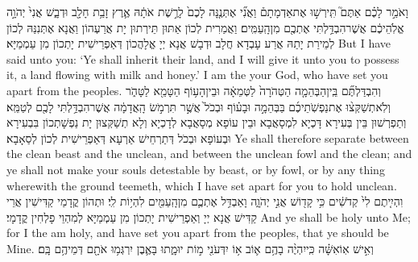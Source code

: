 {וָאֹמַ֣ר לָכֶ֗ם אַתֶּם֮ תִּֽירְשׁ֣וּ אֶת\maqqaf אַדְמָתָם֒ וַאֲנִ֞י אֶתְּנֶ֤נָּה לָכֶם֙ לָרֶ֣שֶׁת אֹתָ֔הּ אֶ֛רֶץ זָבַ֥ת חָלָ֖ב וּדְבָ֑שׁ אֲנִי֙ יְהֹוָ֣ה אֱלֹֽהֵיכֶ֔ם אֲשֶׁר\maqqaf הִבְדַּ֥לְתִּי אֶתְכֶ֖ם מִן\maqqaf הָֽעַמִּֽים׃}
{וַאֲמַרִית לְכוֹן אַתּוּן תֵּירְתוּן יָת אֲרַעְהוֹן וַאֲנָא אֶתְּנִנַּהּ לְכוֹן לְמֵירַת יָתַהּ אֲרַע עָבְדָא חֲלָב וּדְבָשׁ אֲנָא יְיָ אֱלָהֲכוֹן דְּאַפְרֵישִׁית יָתְכוֹן מִן עַמְמַיָּא׃}
{But I have said unto you: ‘Ye shall inherit their land, and I will give it unto you to possess it, a land flowing with milk and honey.’ I am the \lord\space your God, who have set you apart from the peoples.}{}
{וְהִבְדַּלְתֶּ֞ם בֵּֽין\maqqaf הַבְּהֵמָ֤ה הַטְּהֹרָה֙ לַטְּמֵאָ֔ה וּבֵין\maqqaf הָע֥וֹף הַטָּמֵ֖א לַטָּהֹ֑ר וְלֹֽא\maqqaf תְשַׁקְּצ֨וּ אֶת\maqqaf נַפְשֹֽׁתֵיכֶ֜ם בַּבְּהֵמָ֣ה וּבָע֗וֹף וּבְכֹל֙ אֲשֶׁ֣ר תִּרְמֹ֣שׂ הָֽאֲדָמָ֔ה אֲשֶׁר\maqqaf הִבְדַּ֥לְתִּי לָכֶ֖ם לְטַמֵּֽא׃}
{וְתַפְרְשׁוּן בֵּין בְּעִירָא דָּכְיָא לִמְסָאֲבָא וּבֵין עוֹפָא מְסָאֲבָא לְדָכְיָא וְלָא תְשַׁקְּצוּן יָת נַפְשָׁתְכוֹן בִּבְעִירָא וּבְעוֹפָא וּבְכֹל דְּתַרְחֵישׁ אַרְעָא דְּאַפְרֵישִׁית לְכוֹן לְסַאָבָא׃}
{Ye shall therefore separate between the clean beast and the unclean, and between the unclean fowl and the clean; and ye shall not make your souls detestable by beast, or by fowl, or by any thing wherewith the ground teemeth, which I have set apart for you to hold unclean.}{}
{וִהְיִ֤יתֶם לִי֙ קְדֹשִׁ֔ים כִּ֥י קָד֖וֹשׁ אֲנִ֣י יְהֹוָ֑ה וָאַבְדִּ֥ל אֶתְכֶ֛ם מִן\maqqaf הָֽעַמִּ֖ים לִהְי֥וֹת לִֽי׃}
{וּתְהוֹן קֳדָמַי קַדִּישִׁין אֲרֵי קַדִּישׁ אֲנָא יְיָ וְאַפְרֵישִׁית יָתְכוֹן מִן עַמְמַיָּא לְמִהְוֵי פָלְחִין קֳדָמָי׃}
{And ye shall be holy unto Me; for I the \lord\space am holy, and have set you apart from the peoples, that ye should be Mine.}{}
{וְאִ֣ישׁ אֽוֹ\maqqaf אִשָּׁ֗ה כִּֽי\maqqaf יִהְיֶ֨ה בָהֶ֥ם א֛וֹב א֥וֹ יִדְּעֹנִ֖י מ֣וֹת יוּמָ֑תוּ בָּאֶ֛בֶן יִרְגְּמ֥וּ אֹתָ֖ם דְּמֵיהֶ֥ם בָּֽם׃ \petucha }
